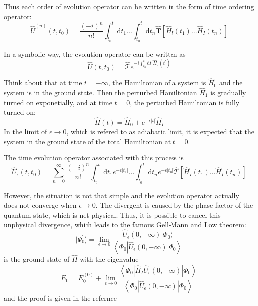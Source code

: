 Thus each order of evolution operator can be written in the form of time ordering operator:
\begin{equation}
\hat{U}^{(n)}\left(t, t_{0}\right)=\frac{(-i)^{n}}{n !} \int_{t_{0}}^{t} \mathrm{d} t_{1} \ldots \int_{t_{0}}^{t} \mathrm{d} t_{n} \hat{\boldsymbol{T}}\left[\hat{H}_{I}\left(t_{1}\right) \ldots \hat{H}_{I}\left(t_{n}\right)\right]
\end{equation}

In a symbolic way, the evolution operator can be written as
\begin{equation}
\hat{U}\left(t, t_{0}\right)=\hat{\mathcal{T}} e^{-i \int_{t_{0}}^{t} \mathrm{d} t^{\prime} \hat{H}_{I}\left(t^{\prime}\right)}
\end{equation}

Think about that at time $t=-\infty$, the Hamiltonian of a system is $\hat{H}_0$ and the system is in the ground state.
Then the perturbed Hamiltonian $\hat{H}_1$ is gradually turned on exponetially, and at time $t=0$, the perturbed Hamiltonian is fully turned on:
\begin{equation}
\hat{H}(t)=\hat{H}_{0}+e^{-\epsilon|t|} \hat{H}_{I}
\end{equation}
In the limit of $\epsilon \rightarrow 0$, which is refered to as adiabatic limit, it is expected that the system in the ground state of the total Hamiltonian at $t=0$.

The time evolution operator associated with this process is
\begin{equation}
\hat{U}_{\epsilon}\left(t, t_{0}\right)=\sum_{n=0}^{\infty} \frac{(-i)^{n}}{n !} \int_{t_{0}}^{t} \mathrm{d} t_{1} e^{-\epsilon\left|t_{1}\right|} \ldots \int_{t_{0}}^{t} \mathrm{d} t_{n} e^{-\epsilon\left|t_{n}\right|} \hat{\mathcal{T}}\left[\hat{H}_{I}\left(t_{1}\right) \ldots \hat{H}_{I}\left(t_{n}\right)\right]
\end{equation}

However, the situation is not that simple and the evolution operator actually does not converge when $\epsilon \rightarrow 0$.
The divergent is caused by the phase factor of the quantum state, which is not physical.
Thus, it is possible to cancel this unphysical divergence, which leads to the famous Gell-Mann and Low theorem:
\begin{equation}
| \Psi_{0}^{\prime} \rangle=\lim _{\epsilon \rightarrow 0} \frac{\hat{U}_{\epsilon}(0,-\infty) | \Phi_{0} \rangle}{\left\langle\Phi_{0}\left|\hat{U}_{\epsilon}(0,-\infty)\right| \Phi_{0}\right\rangle}
\end{equation}
is the ground state of $\hat{H}$ with the eigenvalue
\begin{equation}
E_{0}=E_{0}^{(0)}+\lim _{\epsilon \rightarrow 0} \frac{\left\langle\Phi_{0}\left|\hat{H}_{I} \hat{U}_{\epsilon}(0,-\infty)\right| \Phi_{0}\right\rangle}{\left\langle\Phi_{0}\left|\hat{U}_{\epsilon}(0,-\infty)\right| \Phi_{0}\right\rangle}
\end{equation}
and the proof is given in the refernce \cite{gallmannlow}

